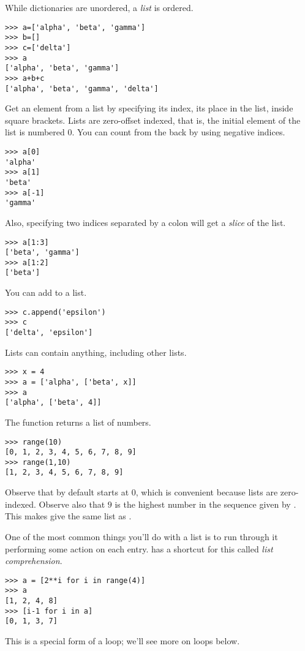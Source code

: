 While dictionaries are unordered, a \python{} \textit{list} is ordered.
\begin{lstlisting}[style=python]
>>> a=['alpha', 'beta', 'gamma']
>>> b=[]
>>> c=['delta']
>>> a
['alpha', 'beta', 'gamma']
>>> a+b+c
['alpha', 'beta', 'gamma', 'delta']
\end{lstlisting}
Get an element from a list by specifying its index, its place in the list,
inside square brackets.
Lists are zero-offset indexed, that is, the initial element of the
list is numbered $0$.
You can count from the back by using negative indices.
\begin{lstlisting}[style=python]
>>> a[0]
'alpha'
>>> a[1]
'beta'
>>> a[-1]
'gamma'
\end{lstlisting}
Also, specifying two indices separated by a colon will get a \textit{slice} 
of the list. 
\begin{lstlisting}[style=python]
>>> a[1:3]
['beta', 'gamma']
>>> a[1:2]
['beta']
\end{lstlisting}
You can add to a list.
\begin{lstlisting}[style=python]
>>> c.append('epsilon')
>>> c
['delta', 'epsilon']  
\end{lstlisting}
Lists can contain anything, including other lists.
\begin{lstlisting}
>>> x = 4
>>> a = ['alpha', ['beta', x]]
>>> a
['alpha', ['beta', 4]]  
\end{lstlisting}

The function  returns a list of numbers.
\begin{lstlisting}[style=python]
 >>> range(10)
[0, 1, 2, 3, 4, 5, 6, 7, 8, 9]
>>> range(1,10)
[1, 2, 3, 4, 5, 6, 7, 8, 9] 
\end{lstlisting}
Observe that by default  starts at $0$, which
is convenient because lists are zero-indexed.
Observe also that $9$ is the highest number in the sequence 
given by .
This makes  give 
the same list as .

One of the most common things you'll do with a list is to run through
it performing some action on each entry.
\python{} has a shortcut for this called \textit{list comprehension}.
\begin{lstlisting}
>>> a = [2**i for i in range(4)]
>>> a
[1, 2, 4, 8]
>>> [i-1 for i in a]
[0, 1, 3, 7]
\end{lstlisting}
This is a special form of a loop; we'll see more on loops below.

